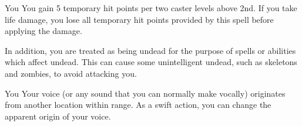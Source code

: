 \begin{spellheader}
    \spelldur{\durlong}
\end{spellheader}
\begin{spelleffects}
    \begin{spelltarget}{You}
        \spelleffect You gain 5 temporary hit points  per two caster levels above 2nd. If you take life damage, you lose all temporary hit points provided by this spell before applying the damage.

        In addition, you are treated as being undead for the purpose of spells or abilities which affect undead. This can cause some unintelligent undead, such as skeletons and zombies, to avoid attacking you.
    \end{spelltarget}
\end{spelleffects}

\begin{spellheader}
    \spellrng{\rngmed}
    \spelldur{\durshort \dismissable}
\end{spellheader}
\begin{spelleffects}
    \begin{spelltarget}{You}
        \spelleffect Your voice (or any sound that you can normally make vocally) originates from another location within range. As a swift action, you can change the apparent origin of your voice.
    \end{spelltarget}
\end{spelleffects}

\begin{comment}
\spellsection{Vestments of the Mage}{2}
\begin{spellheader}
    \spelldesc{You imbue a set of armor with magical power, preventing it from interfering with your spellcasting.}
    \spellinfo{Trans (Imbuement)}{Arcane}
    \spelltwocol{\spelltgt{One nonmagical armor or shield}}{\spellrng{Touch}}
\end{spellheader}
\begin{spelleffects}
    \spelldur{\durext \dismissable}
    \spelleffect The armor or shield's chance of arcane spell failure decreases by 10\% as long as you are wearing or using it. If any other creature wears the armor, it receives no benefit from this spell.
\end{spelleffects}
\begin{spellfooter}
    \spellnotes This decrease is considered an enhancement enhancement bonus.
\end{spellfooter}%
\end{comment}

